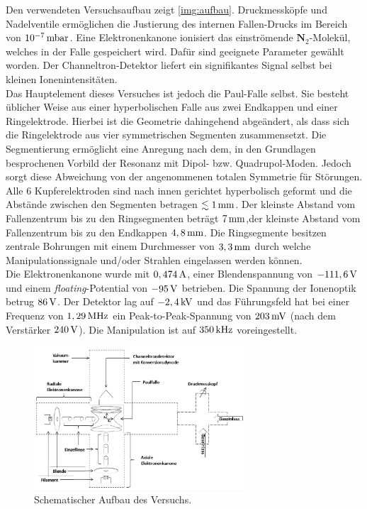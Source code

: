\documentclass[numbers=noenddot,a4paper,notitlepage,twoside,BCOR15mm]{scrartcl}
\newcommand{\tenpo}[1]{ 10^{#1}}
\newcommand{\tilt}[1]{\textit{#1}}
\newcommand{\fett}[1]{\textbf{#1}}
\begin{document}
		Den verwendeten Versuchsaufbau zeigt \autoref{img:aufbau}. Druckmessköpfe und Nadelventile ermöglichen die Justierung des internen Fallen-Drucks im Bereich von $\unit[\tenpo{-7}]{mbar}$. Eine Elektronenkanone ionisiert das einströmende $\fett{N}_2$-Molekül, welches in der Falle gespeichert wird. Dafür sind geeignete Parameter gewählt worden. Der Channeltron-Detektor liefert ein signifikantes Signal selbst bei kleinen Ionenintensitäten.\\
		Das Hauptelement dieses Versuches ist jedoch die Paul-Falle selbst. Sie besteht üblicher Weise aus einer hyperbolischen Falle aus zwei Endkappen und einer Ringelektrode. Hierbei ist die Geometrie dahingehend abgeändert, als dass sich die Ringelektrode aus vier symmetrischen Segmenten zusammensetzt. Die Segmentierung ermöglicht eine Anregung nach dem, in den Grundlagen besprochenen Vorbild der Resonanz mit Dipol- bzw. Quadrupol-Moden. Jedoch sorgt diese Abweichung von der angenommenen totalen Symmetrie für Störungen.\\
		Alle 6 Kupferelektroden sind nach innen gerichtet hyperbolisch geformt und die Abstände zwischen den Segmenten betragen $\lesssim\unit[1]{mm}$. Der kleinste Abstand vom Fallenzentrum bis zu den Ringsegmenten beträgt $\unit[7]{mm}$,der kleinste Abstand vom Fallenzentrum bis zu den Endkappen $\unit[4,8]{mm}$. Die Ringsegmente besitzen zentrale Bohrungen mit einem Durchmesser von $\unit[3,3]{mm}$ durch welche Manipulationssignale und/oder Strahlen eingelassen werden können.\\
		Die Elektronenkanone wurde mit $\unit[0,474]{A}$, einer Blendenspannung von $\unit[-111,6]{V}$ und einem \tilt{floating}-Potential von $\unit[-95]{V}$ betrieben. Die Spannung der Ionenoptik betrug $\unit[86]{V}$. Der Detektor lag auf $\unit[-2,4]{kV}$ und das Führungsfeld hat bei einer Frequenz von $\unit[1,29]{MHz}$ ein Peak-to-Peak-Spannung von $\unit[203]{mV}$ (nach dem Verstärker $\unit[240]{V}$). Die Manipulation ist auf $\unit[350]{kHz}$ voreingestellt.

			\begin{figure}
				\centering
				\includegraphics[width=0.7\textwidth]{aufbau.png}
				\caption{Schematischer Aufbau des Versuchs. \cite{EMAUGreifswaldPaul}}\label{img:aufbau}
			\end{figure}
\end{document}
